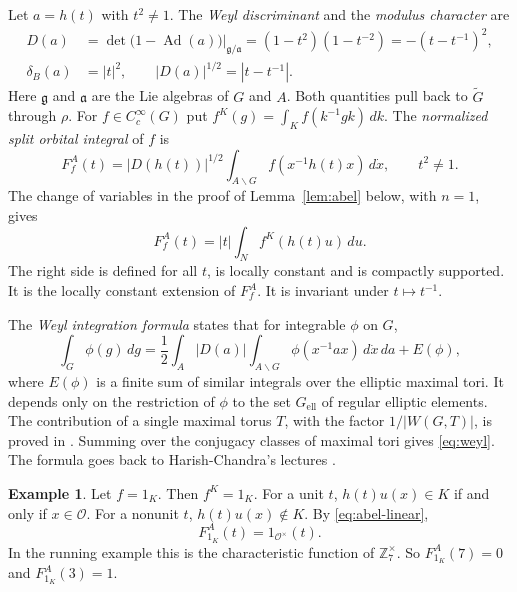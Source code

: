 \documentclass[12pt,letterpaper]{article}
\numberwithin{equation}{section}
\theoremstyle{plain}
\theoremstyle{definition}
\newtheorem{example}[theorem]{Example}
\theoremstyle{remark}
\newcommand{\Gt}{\widetilde G}
\newcommand{\Zz}{\mathbb Z}
\newcommand{\Of}{\mathcal O}
\DeclareMathOperator{\Ad}{Ad}
\begin{document}
Let $a=h(t)$ with $t^2\ne1$. The \emph{Weyl discriminant} and the
\emph{modulus character} are
\begin{align}
D(a)&=\det\bigl(1-\Ad(a)\bigr)\big|_{\mathfrak g/\mathfrak a}
     =(1-t^2)(1-t^{-2})=-(t-t^{-1})^2,\label{eq:D}\\
\delta_B(a)&=|t|^2,\qquad |D(a)|^{1/2}=|t-t^{-1}|.\label{eq:delta}
\end{align}
Here $\mathfrak g$ and $\mathfrak a$ are the Lie algebras of $G$ and
$A$. Both quantities pull back to $\Gt$ through $\rho$. For
$f\in C_c^\infty(G)$ put $f^K(g)=\int_Kf(k^{-1}gk)\,dk$. The
\emph{normalized split orbital integral} of $f$ is
\begin{equation}\label{eq:FA}
F_f^A(t)=|D(h(t))|^{1/2}\int_{A\backslash G}f(x^{-1}h(t)x)\,d\dot x,
\qquad t^2\ne1 .
\end{equation}
The change of variables in the proof of Lemma~\ref{lem:abel} below,
with $n=1$, gives
\begin{equation}\label{eq:abel-linear}
F_f^A(t)=|t|\int_Nf^K(h(t)u)\,du .
\end{equation}
The right side is defined for all $t$, is locally constant and is
compactly supported. It is the locally constant extension of $F_f^A$.
It is invariant under $t\mapsto t^{-1}$.

The \emph{Weyl integration formula} states that for integrable $\phi$
on $G$,
\begin{equation}\label{eq:weyl}
\int_G\phi(g)\,dg=\frac12\int_A|D(a)|\int_{A\backslash G}
\phi(x^{-1}ax)\,d\dot x\,da+E(\phi),
\end{equation}
where $E(\phi)$ is a finite sum of similar integrals over the elliptic
maximal tori. It depends only on the restriction of $\phi$ to the set
$G_{\mathrm{ell}}$ of regular elliptic elements. The contribution of a
single maximal torus $T$, with the factor $1/|W(G,T)|$, is proved in
\cite[Theorem~47]{Wi15}. Summing over the conjugacy classes of maximal
tori gives \eqref{eq:weyl}. The formula goes back to Harish-Chandra's
lectures \cite{Si79}.

\begin{example}\label{ex:FA-unit}
Let $f=1_K$. Then $f^K=1_K$. For a unit $t$, $h(t)u(x)\in K$ if and
only if $x\in\Of$. For a nonunit $t$, $h(t)u(x)\notin K$. By
\eqref{eq:abel-linear},
\[
F_{1_K}^A(t)=1_{\Of^\times}(t).
\]
In the running example this is the characteristic function of
$\Zz_7^\times$. So $F_{1_K}^A(7)=0$ and $F_{1_K}^A(3)=1$.
\end{example}
\end{document}
